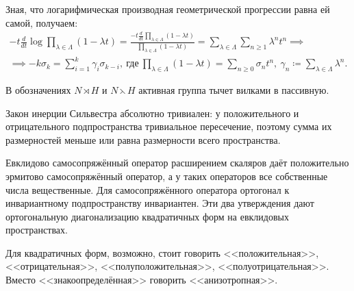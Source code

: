 \documentclass[
	extrafontsizes,
	11pt,
	hyphens,
]{memoir}
\begin{document}

\begin{observation}
Зная, что логарифмическая производная геометрической прогрессии равна ей самой, получаем:
\begin{gather*}
- t \frac{d}{dt} \log \prod_{\lambda \in \Lambda} (1 - \lambda t)
=
\frac{-t \frac{d}{dt} \prod_{\lambda \in \Lambda} (1 - \lambda t)}{\prod_{\lambda \in \Lambda} (1 - \lambda t)}
=
\sum_{\lambda \in \Lambda} \sum_{n\geqslant1} \lambda^n t^n
\implies
\\
\implies
-k\sigma_k=\sum_{i=1}^k \gamma_i \sigma_{k-i},\ 
\text{где}\ 
\prod_{\lambda \in \Lambda} (1-\lambda t) = \sum_{n \geq 0} \sigma_n t^n,\ 
\gamma_n \coloneqq \sum_{\lambda \in \Lambda} \lambda^n.
\end{gather*}
\end{observation}

\begin{notation}
В обозначениях
\(N \rtimes H\) и \(N \leftthreetimes H\)
активная группа тычет вилками в пассивную.
\end{notation}

\begin{observation}
Закон инерции Сильвестра абсолютно тривиален: у положительного и отрицательного подпространства тривиальное пересечение, поэтому сумма их размерностей меньше или равна размерности всего пространства.
\end{observation}

\begin{observation}
Евклидово самосопряжённый оператор расширением скаляров даёт положительно эрмитово самосопряжённый оператор, а у таких операторов все собственные числа вещественные.
Для самосопряжённого оператора ортогонал к инвариантному подпространству инвариантен.
Эти два утверждения дают ортогональную диагонализацию квадратичных форм на евклидовых пространствах.
\end{observation}

\begin{convention}
Для квадратичных форм, возможно, стоит говорить <<положительная>>, <<отрицательная>>, <<полуположительная>>, <<полуотрицательная>>. Вместо <<знакоопределённая>> говорить <<анизотропная>>.
\end{convention}
\end{document}
